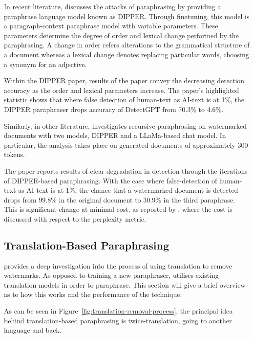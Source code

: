 \documentclass{l4proj}
\theoremstyle{definition}
\begin{document}
        In recent literature, \citet{krishna2023paraphrasing} discusses the attacks of paraphrasing by providing a paraphrase language model known as DIPPER. Through finetuning, this model is a paragraph-context paraphrase model with variable parameters. These parameters determine the degree of order and lexical change performed by the paraphrasing. A change in order refers alterations to the grammatical structure of a document whereas a lexical change denotes replacing particular words, choosing a synonym for an adjective.

        Within the DIPPER paper, results of the paper convey the decreasing detection accuracy as the order and lexical parameters increase. The paper's highlighted statistic shows that where false detection of human-text as AI-text is at 1\%, the DIPPER paraphraser drops accuracy of DetectGPT from 70.3\% to 4.6\%.

        Similarly, in other literature, \citet{sadasivan2023aigenerated} investigates recursive paraphrasing on watermarked documents with two models, DIPPER and a LLaMa-based chat model. In particular, the analysis takes place on generated documents of approximately 300 tokens. 

        The paper reports results of clear degradation in detection through the iterations of DIPPER-based paraphrasing. With the case where false-detection of human-text as AI-text is at 1\%, the chance that a watermarked document is detected drops from 99.8\% in the original document to 30.9\% in the third paraphrase. This is significant change at minimal cost, as reported by \citet{sadasivan2023aigenerated}, where the cost is discussed with respect to the perplexity metric. 

    \subsection{Translation-Based Paraphrasing}
        \citet{he2024watermarks} provides a deep investigation into the process of using translation to remove watermarks. As opposed to training a new paraphraser, \citet{he2024watermarks} utilises existing translation models in order to paraphrase. This section will give a brief overview as to how this works and the performance of the technique. 

        As can be seen in Figure~\ref{fig:translation-removal-process}, the principal idea behind translation-based paraphrasing is twice-translation, going to another language and back. 
\end{document}
